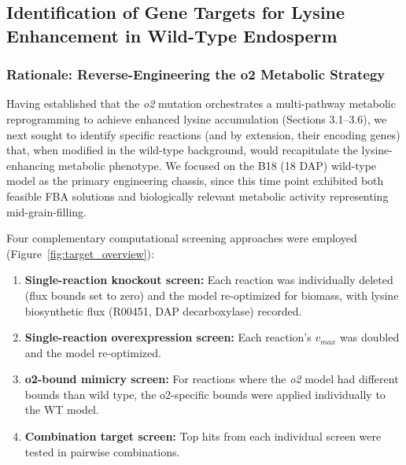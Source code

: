 

\subsection{Identification of Gene Targets for Lysine Enhancement in Wild-Type Endosperm}

\subsubsection{Rationale: Reverse-Engineering the o2 Metabolic Strategy}

Having established that the \textit{o2} mutation orchestrates a multi-pathway metabolic reprogramming to achieve enhanced lysine accumulation (Sections 3.1--3.6), we next sought to identify specific reactions (and by extension, their encoding genes) that, when modified in the wild-type background, would recapitulate the lysine-enhancing metabolic phenotype. We focused on the B18 (18 DAP) wild-type model as the primary engineering chassis, since this time point exhibited both feasible FBA solutions and biologically relevant metabolic activity representing mid-grain-filling.

Four complementary computational screening approaches were employed (Figure~\ref{fig:target_overview}):
\begin{enumerate}
    \item \textbf{Single-reaction knockout screen:} Each reaction was individually deleted (flux bounds set to zero) and the model re-optimized for biomass, with lysine biosynthetic flux (R00451, DAP decarboxylase) recorded.
    \item \textbf{Single-reaction overexpression screen:} Each reaction's $v_{max}$ was doubled and the model re-optimized.
    \item \textbf{o2-bound mimicry screen:} For reactions where the \textit{o2} model had different bounds than wild type, the o2-specific bounds were applied individually to the WT model.
    \item \textbf{Combination target screen:} Top hits from each individual screen were tested in pairwise combinations.
\end{enumerate}

